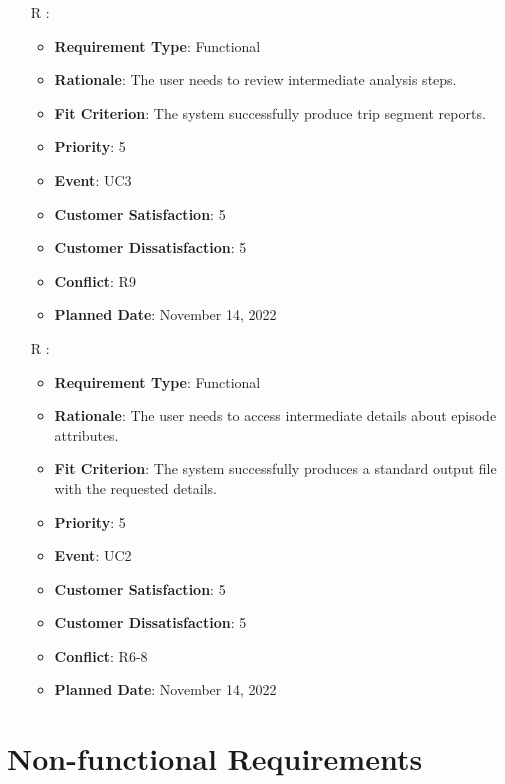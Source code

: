 \documentclass[12pt, titlepage]{article}
\newcounter{reqnum} %
\begin{document}
\begin{itemize}
\item[R\refstepcounter{reqnum}\thereqnum
\label{R_Inputs_1}:] 
\begin{itemize}
    \item \textbf{Requirement Type}: Functional
    \item \textbf{Rationale}: The user needs to review intermediate analysis steps. 
    \item \textbf{Fit Criterion}: The system successfully produce trip segment reports. 
    \item \textbf{Priority}: 5
    \item \textbf{Event}: UC3
    \item \textbf{Customer Satisfaction}: 5
    \item \textbf{Customer Dissatisfaction}: 5
    \item \textbf{Conflict}: R9
    \item \textbf{Planned Date}: November 14, 2022
\end{itemize}

\item[R\refstepcounter{reqnum}\thereqnum
\label{R_Inputs_1}:] 
\begin{itemize}
    \item \textbf{Requirement Type}: Functional
    \item \textbf{Rationale}: The user needs to access intermediate details about episode attributes.
    \item \textbf{Fit Criterion}: The system successfully produces a standard output file with the requested details.
    \item \textbf{Priority}: 5
    \item \textbf{Event}: UC2
    \item \textbf{Customer Satisfaction}: 5
    \item \textbf{Customer Dissatisfaction}: 5
    \item \textbf{Conflict}: R6-8
    \item \textbf{Planned Date}: November 14, 2022
\end{itemize}

\end{itemize}

\section{Non-functional Requirements}
\end{document}
